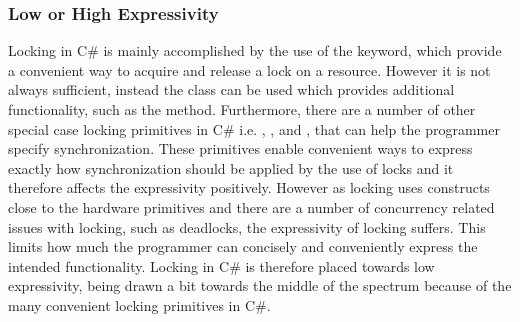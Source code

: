 \subsubsection{Low or High Expressivity}\label{subsec:expressivity}
Locking in C\# is mainly accomplished by the use of the  keyword, which provide a convenient way to acquire and release a lock on a resource. However it is not always sufficient, instead the  class can be used which provides additional functionality, such as the  method. Furthermore, there are a number of other special case locking primitives in C\#\cite{microsoftSyncPrim} i.e. , ,  and , that can help the programmer specify synchronization. These primitives enable convenient ways to express exactly how synchronization should be applied by the use of locks and it therefore affects the expressivity positively. However as locking uses constructs close to the hardware primitives and there are a number of concurrency related issues with locking, such as deadlocks, the expressivity of locking suffers. This limits how much the programmer can concisely and conveniently express the intended functionality. Locking in C\# is therefore placed towards low expressivity, being drawn a bit towards the middle of the spectrum because of the many convenient locking primitives in C\#.











